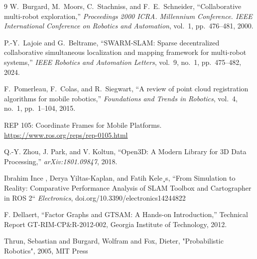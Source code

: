 \documentclass[11pt]{article}
\begin{document}
\begin{thebibliography}{9}
	W.~Burgard, M.~Moors, C.~Stachniss, and F.~E.~Schneider,
	``Collaborative multi-robot exploration,''
	\emph{Proceedings 2000 ICRA. Millennium Conference. IEEE International Conference on Robotics and Automation},
	vol.~1, pp.~476--481, 2000.
	
	P.-Y.~Lajoie and G.~Beltrame,
	``SWARM-SLAM: Sparse decentralized collaborative simultaneous localization and mapping framework for multi-robot systems,''
	\emph{IEEE Robotics and Automation Letters},
	vol.~9, no.~1, pp.~475--482, 2024.
	
	F.~Pomerleau, F.~Colas, and R.~Siegwart,
	``A review of point cloud registration algorithms for mobile robotics,''
	\emph{Foundations and Trends in Robotics},
	vol.~4, no.~1, pp.~1--104, 2015.
	
	REP 105: Coordinate Frames for Mobile Platforms. 
	\url{https://www.ros.org/reps/rep-0105.html}
	
	Q.-Y. Zhou, J. Park, and V. Koltun,
	``Open3D: A Modern Library for 3D Data Processing,''
	\textit{arXiv:1801.09847}, 2018.
	
	Ibrahim Ince , Derya Yiltas-Kaplan, and Fatih Kele¸s,
	``From Simulation to Reality: Comparative Performance Analysis
	of SLAM Toolbox and Cartographer in ROS 2``
	\emph{Electronics},
	doi.org/10.3390/electronics14244822
	
	
	F. Dellaert,
	``Factor Graphs and GTSAM: A Hands-on Introduction,''
	Technical Report GT-RIM-CP\&R-2012-002, Georgia Institute of Technology, 2012.
	
	Thrun, Sebastian and Burgard, Wolfram and Fox, Dieter,
		"Probabilistic Robotics",
		2005, MIT Press
	
	
	
\end{thebibliography}
\end{document}
